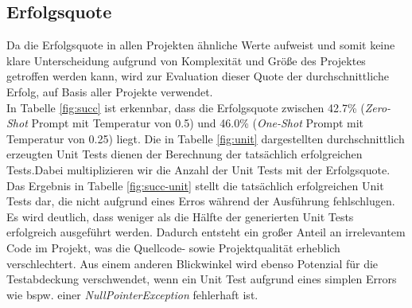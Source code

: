 \subsection{Erfolgsquote}
Da die Erfolgsquote in allen Projekten ähnliche Werte aufweist und somit keine klare Unterscheidung aufgrund von Komplexität und Größe des Projektes getroffen werden kann, wird zur Evaluation dieser Quote der durchschnittliche Erfolg, auf Basis aller Projekte verwendet.\\
In Tabelle \ref{fig:succ} ist erkennbar, dass die Erfolgsquote zwischen 42.7\% (\textit{Zero-Shot} Prompt mit Temperatur von 0.5) und 46.0\% (\textit{One-Shot} Prompt mit Temperatur von 0.25) liegt. Die in Tabelle \ref{fig:unit} dargestellten durchschnittlich erzeugten Unit Tests dienen der Berechnung der tatsächlich erfolgreichen Tests.Dabei multiplizieren wir die Anzahl der Unit Tests mit der Erfolgsquote. Das Ergebnis in Tabelle \ref{fig:succ-unit} stellt die tatsächlich erfolgreichen Unit Tests dar, die nicht aufgrund eines Erros während der Ausführung fehlschlugen.  Es wird deutlich, dass weniger als die Hälfte der generierten Unit Tests erfolgreich ausgeführt werden. Dadurch entsteht ein großer Anteil an irrelevantem Code im Projekt, was die Quellcode- sowie Projektqualität erheblich verschlechtert. Aus einem anderen Blickwinkel wird ebenso Potenzial für die Testabdeckung verschwendet, wenn ein Unit Test aufgrund eines simplen Errors wie bspw. einer \textit{NullPointerException} fehlerhaft ist.

